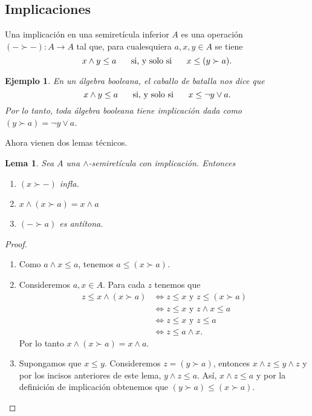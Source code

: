 \documentclass[12pt,letterpaper,titlepage]{article}
\newtheorem*{exa}{Ejemplo}
\newtheorem{lemma}{Lema}
\theoremstyle{definition}
\renewcommand\sup{\vee}
\renewcommand\inf{\wedge}
\newcommand\ssi{\hspace{5mm}\text{ si, y solo si }\hspace{5mm}}
\newcommand\<{\langle}
\renewcommand\>{\rangle}
\begin{document}

\subsection{Implicaciones}

Una implicación en una semiretícula inferior $A$ es una operación
$(-\succ -):A\to A$ tal que, para cualesquiera $a,x,y\in A$ se tiene
\[
  x\inf y\leq a \ssi x\leq (y\succ a )
.\]

\begin{exa}
  En un álgebra booleana, el caballo de batalla nos dice que
  \[
    x\inf y\leq a \ssi
    x\leq \neg y\sup a
  .\]
  Por lo tanto, toda álgebra booleana tiene implicación dada
  como $(y\succ a)=\neg y\sup a$.
\end{exa}

Ahora vienen dos lemas técnicos.
\begin{lemma}
  Sea $A$ una $\inf$-semiretícula con implicación.
  Entonces
  \begin{enumerate}
    \item $(x\succ -)$ infla.
    \item $x\inf(x\succ a) = x\inf a$
    \item $(-\succ a)$ es antítona.
  \end{enumerate}
\end{lemma}

\begin{proof}
    \begin{enumerate}
        \item Como $a\wedge x\leq a$, tenemos
        $a\leq (x\succ a).$
        \item Consideremos $a, x\in A$.
        Para cada $z$ tenemos que 
        \begin{align*}
            z\leq x\wedge (x\succ a)
            & \iff z\leq x \mbox{ y } z\leq (x\succ a)\\
            & \iff z\leq x \mbox{ y } z\wedge x\leq a\\
            & \iff z\leq x \mbox{ y } z\leq a\\
            & \iff z\leq a\wedge x.
        \end{align*}
        Por lo tanto $x\inf(x\succ a) = x\inf a$.
        \item Supongamos que $x\leq y$. Consideremos $z=(y\succ a)$, entonces $x\wedge z\leq y\wedge z$ y por los incisos anteriores de este lema, $y\wedge z\leq a$. Así, $x\wedge z\leq a$ y por la definición de implicación obtenemos que $(y\succ a)\leq (x\succ a)$. 
    \end{enumerate}
\end{proof}
\end{document}
